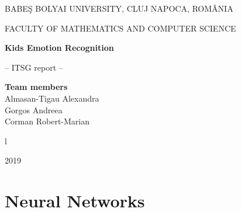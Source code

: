 \documentclass[runningheads,a4paper,11pt]{report}
\begin{document}
\begin{titlepage}
\sloppy
\begin{center}
BABE\c S BOLYAI UNIVERSITY, CLUJ NAPOCA, ROM\^ ANIA

FACULTY OF MATHEMATICS AND COMPUTER SCIENCE

\vspace{6cm}

\Huge \textbf{Kids Emotion Recognition}

\vspace{1cm}

\normalsize -- ITSG report --

\end{center}


\vspace{5cm}

\begin{flushright}
\Large{\textbf{Team members}}\\
Almasan-Tigau Alexandra \\
Gorgos Andreea \\
Corman Robert-Marian \\
\end{flushright}

\vspace{4cm}
l
\begin{center}
2019
\end{center}

\end{titlepage}


\tableofcontents

\newpage

\newpage




\newpage



 

\chapter{Neural Networks}
\label{chapter:neuralnetworks}
\end{document}
